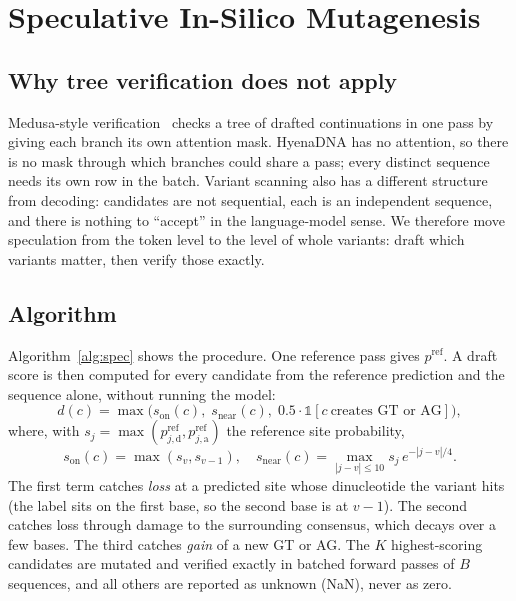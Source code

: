 \documentclass[conference]{IEEEtran}
\begin{document}
\section{Speculative In-Silico Mutagenesis}\label{sec:spec}
\subsection{Why tree verification does not apply}
Medusa-style verification~\cite{cai2024medusa} checks a tree of drafted continuations in one pass by giving each branch its own attention mask. HyenaDNA has no attention, so there is no mask through which branches could share a pass; every distinct sequence needs its own row in the batch. Variant scanning also has a different structure from decoding: candidates are not sequential, each is an independent sequence, and there is nothing to ``accept'' in the language-model sense. We therefore move speculation from the token level to the level of whole variants: draft which variants matter, then verify those exactly.

\subsection{Algorithm}
Algorithm~\ref{alg:spec} shows the procedure. One reference pass gives $p^{\mathrm{ref}}$. A draft score is then computed for every candidate from the reference prediction and the sequence alone, without running the model:
\begin{equation}
d(c)=\max\big(s_{\mathrm{on}}(c),\; s_{\mathrm{near}}(c),\; 0.5\cdot\mathbb{1}[c\ \text{creates GT or AG}]\big),
\end{equation}
where, with $s_j=\max(p^{\mathrm{ref}}_{j,\mathrm{d}},p^{\mathrm{ref}}_{j,\mathrm{a}})$ the reference site probability,
\begin{equation}
s_{\mathrm{on}}(c)=\max(s_v,s_{v-1}),\quad s_{\mathrm{near}}(c)=\max_{|j-v|\le 10} s_j\,e^{-|j-v|/4}.
\end{equation}
The first term catches \emph{loss} at a predicted site whose dinucleotide the variant hits (the label sits on the first base, so the second base is at $v-1$). The second catches loss through damage to the surrounding consensus, which decays over a few bases. The third catches \emph{gain} of a new GT or AG. The $K$ highest-scoring candidates are mutated and verified exactly in batched forward passes of $B$ sequences, and all others are reported as unknown (NaN), never as zero.
\end{document}

